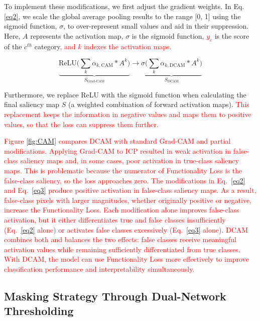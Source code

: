 \documentclass[preprint,7pt, a4paper]{elsarticle}
\begin{document}
To implement these modifications, we first adjust the gradient weights. In Eq. \ref{eq2}, we scale the global average pooling results to the range [0, 1] using the sigmoid function, $\sigma$, to over-represent small values and aid in their suppression. Here, $A$ represents the activation map, $\sigma$ is the sigmoid function, \textcolor{red}{$y_c$} is the score of the $c^{th}$ category\textcolor{red}{, and $k$ indexes the activation maps.}
    
    \begin{equation}
        \underbrace{
            \text{ReLU}\bigg(\sum_{k}\alpha_{k,\text{CAM}} * A^{k}\bigg)
        }_{S_\text{Grad-CAM}}
        \rightarrow
        \underbrace{
            \sigma\bigg(\sum_{k}\alpha_{k,\text{DCAM}} * A^{k}\bigg)
        }_{S_\text{DCAM}}
    \label{eq3}
    \end{equation}

Furthermore, we replace ReLU with the sigmoid function when calculating the final saliency map $S$ (a weighted combination of forward activation maps). \textcolor{red}{This replacement keeps the information in negative values and maps them to positive values, so that the loss can suppress them further.}

\textcolor{red}{Figure \ref{fig:CAM} compares DCAM with standard Grad-CAM and partial modifications. Applying Grad-CAM to ICP resulted in weak activation in false-class saliency maps and, in some cases, poor activation in true-class saliency maps. This is problematic because the numerator of Functionality Loss is the false-class saliency, so the loss approaches zero. The modifications in Eq.~\ref{eq2} and Eq.~\ref{eq3} produce positive activation in false-class saliency maps. As a result, false-class pixels with larger magnitudes, whether originally positive or negative, increase the Functionality Loss. Each modification alone improves false-class activation, but it either differentiates true and false classes insufficiently (Eq.~\ref{eq2} alone) or activates false classes excessively (Eq.~\ref{eq3} alone). DCAM combines both and balances the two effects: false classes receive meaningful activation values while remaining sufficiently differentiated from true classes. With DCAM, the model can use Functionality Loss more effectively to improve classification performance and interpretability simultaneously.}


\subsection{Masking Strategy Through Dual-Network Thresholding}
\label{m3}
\end{document}
